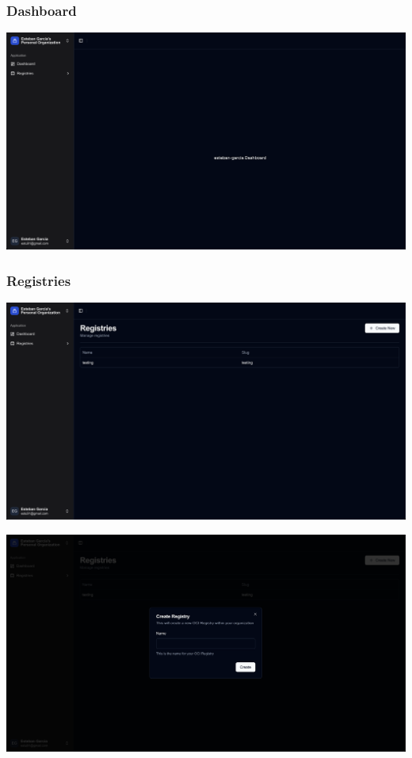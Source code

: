 \documentclass{article}
\begin{document}
  \subsubsection{Dashboard}

  \includegraphics[scale=0.28]{screenshots/dashboard.png} 

  \subsubsection{Registries}

  \includegraphics[scale=0.28]{screenshots/registries.png}

  \includegraphics[scale=0.28]{screenshots/create-registry.png}
\end{document}
